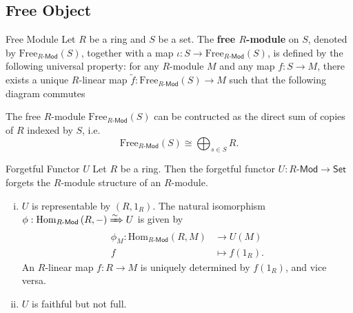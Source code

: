 \subsection{Free Object}
\begin{definition}{Free Module}{}
    Let $R$ be a ring and $S$ be a set. The \textbf{free $R$-module } on $S$, denoted by $\mathrm{Free}_{R\text{-}\mathsf{Mod}}(S)$, together with a map $\iota:S\to \mathrm{Free}_{R\text{-}\mathsf{Mod}}(S)$, is defined by the following universal property: for any $R$-module $M$ and any map $f:S\to M$, there exists a unique $R$-linear map $\widetilde{f}:\mathrm{Free}_{R\text{-}\mathsf{Mod}}(S)\to M$ such that the following diagram commutes
    \begin{center}
    \end{center}
    The free $R$-module $\mathrm{Free}_{R\text{-}\mathsf{Mod}}(S)$ can be contructed as the direct sum of copies of $R$ indexed by $S$, i.e. 
    \[
        \mathrm{Free}_{R\text{-}\mathsf{Mod}}(S)\cong \bigoplus_{s\in S}R.
    \]
\end{definition}


\begin{example}{Forgetful Functor $U$}{}
    Let $R$ be a ring. Then the forgetful functor $U:R\text{-}\mathsf{Mod}\to \mathsf{Set}$ forgets the $R$-module structure of an $R$-module. 
    \begin{enumerate}[(i)]
        \item $U$ is representable by $\left(R, 1_R\right)$. The natural isomorphism $\phi:\mathrm{Hom}_{R\text{-}\mathsf{Mod}}\left(R, -\right)\xRightarrow{\sim} U$ is given by 
        \begin{align*}
            \phi_M:\mathrm{Hom}_{R\text{-}\mathsf{Mod}}\left(R, M\right)&\longrightarrow U(M)\\
            f&\longmapsto f(1_R).
        \end{align*}
        An $R$-linear map $f:R\to M$ is uniquely determined by $f(1_R)$, and vice versa.
        \item $U$ is faithful but not full.
    \end{enumerate}
\end{example}
 

